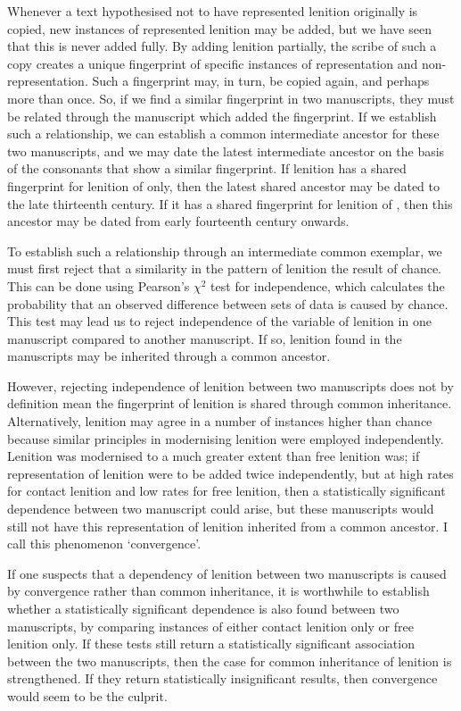 Whenever a text hypothesised not to have represented lenition originally is copied, new instances of represented lenition may be added, but we have seen that this is never added fully. By adding lenition partially, the scribe of such a copy creates a unique fingerprint of specific instances of representation and non-representation. Such a fingerprint may, in turn, be copied again, and perhaps more than once. So, if we find a similar fingerprint in two manuscripts, they must be related through the manuscript which added the fingerprint. If we establish such a relationship, we can establish a common intermediate ancestor for these two manuscripts, and we may date the latest intermediate ancestor on the basis of the consonants that show a similar fingerprint. If lenition has a shared fingerprint for lenition of  only, then the latest shared ancestor may be dated to the late thirteenth century. If it has a shared fingerprint for lenition of , then this ancestor may be dated from early fourteenth century onwards.

To  establish such a relationship through an intermediate common exemplar, we must first reject that a similarity in the pattern of lenition the result of chance. This can be done using Pearson's \(\chi^2\) test for independence, which calculates the probability that an observed difference between sets of data is caused by chance. This test may lead us to reject independence of the variable of lenition in one manuscript compared to another manuscript. If so, lenition found in the manuscripts may be inherited through a common ancestor.

However, rejecting independence of lenition between two manuscripts does not by definition mean the fingerprint of lenition is shared through common inheritance. Alternatively, lenition may agree in a number of instances higher than chance because similar principles in modernising lenition were employed independently. Lenition was modernised to a much greater extent than free lenition was; if representation of lenition were to be added twice independently, but at high rates for contact lenition and low rates for free lenition, then a statistically significant dependence between two manuscript could arise, but these manuscripts would still not have this representation of lenition inherited from a common ancestor. I call this phenomenon `convergence'.

If one suspects that a dependency of lenition between two manuscripts is caused by convergence rather than common inheritance, it is worthwhile to establish whether a statistically significant dependence is also found between two manuscripts, by comparing instances of either contact lenition only or free lenition only. If these tests still return a statistically significant association between the two manuscripts, then the case for common inheritance of lenition is strengthened. If they return statistically insignificant results, then convergence would seem to be the culprit.

